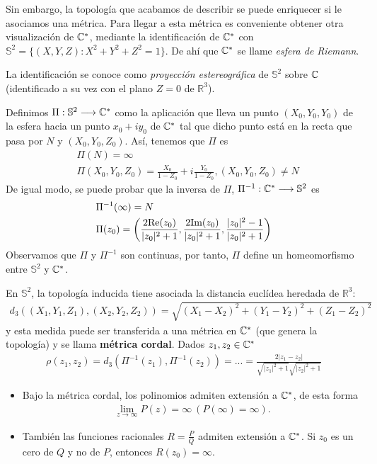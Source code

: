 Sin embargo, la topología que acabamos de describir se puede enriquecer si le asociamos una métrica. Para llegar a esta métrica es conveniente obtener otra visualización de $\mathbb{C}^*$, mediante la identificación de $\mathbb{C}^*$ con $\mathbb{S}^2 = \{(X,Y,Z) : X^2 + Y^2 + Z^2 = 1\}$. De ahí que $\mathbb{C}^*$ se llame \textit{esfera de Riemann}.

La identificación se conoce como \textit{proyección estereográfica} de $\mathbb{S}^2$ sobre $\mathbb{C}$ (identificado a su vez con el plano $Z = 0$ de $\mathbb{R}^3$).

Definimos $\Pi : \mathbb{S}^2 \longrightarrow \mathbb{C}^*$ como la aplicación que lleva un punto $(X_0,Y_0,Y_0)$ de la esfera hacia un punto $x_0 + iy_0$ de $\mathbb{C}^*$ tal que dicho punto está en la recta que pasa por $N$ y $(X_0,Y_0,Z_0)$. Así, tenemos que $\Pi$ es
\begin{align*}
     & \Pi(N) = \infty                                                                     \\
     & \Pi(X_0,Y_0,Z_0) = \frac{X_0}{1-Z_0} + i\frac{Y_0}{1 - Z_0}, (X_0,Y_0,Z_0) \not = N
\end{align*}
De igual modo, se puede probar que la inversa de $\Pi$, $\Pi^{-1} : \mathbb{C}^* \longrightarrow \mathbb{S}^2$ es
\begin{align*}
     & \Pi^{-1}(\infty) = N                                                                                                   \\
     & \Pi(z_0) = \left( \frac{2\text{Re}(z_0)}{|z_0|^2 + 1}, \frac{2\text{Im}(z_0)}{|z_0|^2 + 1}, \frac{|z_0|^2 - 1}{|z_0|^2 + 1}\right)
\end{align*}
Observamos que $\Pi$ y $\Pi^{-1}$ son continuas, por tanto, $\Pi$ define un homeomorfismo entre $\mathbb{S}^2$ y $\mathbb{C}^*$.

En $\mathbb{S}^2$, la topología inducida tiene asociada la distancia euclídea heredada de $\mathbb{R}^3$:
\begin{align*}
    d_3((X_1,Y_1,Z_1),(X_2,Y_2,Z_2)) = \sqrt{(X_1 - X_2)^2 + (Y_1 - Y_2)^2 + (Z_1 - Z_2)^2}
\end{align*}
y esta medida puede ser transferida a una métrica en $\mathbb{C}^*$ (que genera la topología) y se llama \textbf{métrica cordal}. Dados $z_1,z_2 \in \mathbb{C}^*$
\begin{align*}
    \rho(z_1,z_2) = d_3\left( \Pi^{-1}(z_1), \Pi^{-1}(z_2)\right) = ... = \frac{2|z_1 - z_2|}{\sqrt{|z_1|^2+1}\sqrt{|z_2|^2+1}}
\end{align*}

\begin{obs}
    \begin{itemize}
        \item Bajo la métrica cordal, los polinomios admiten extensión a $\mathbb{C}^*$, de esta forma
              \begin{align*}
                  \lim_{z \to \infty}{P(z) = \infty} \ (P(\infty) = \infty).
              \end{align*}
        \item También las funciones racionales $R = \frac{P}{Q}$ admiten extensión a $\mathbb{C}^*$. Si $z_0$ es un cero de $Q$ y no de $P$, entonces $R(z_0) = \infty$.
    \end{itemize}
\end{obs}

